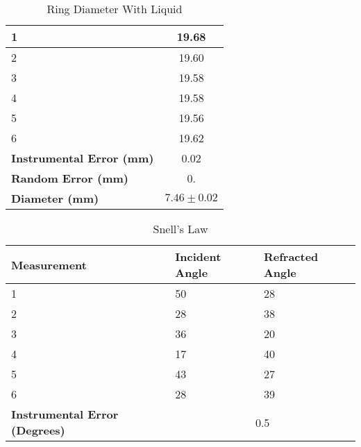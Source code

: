 \begin{center}
\begin{table}[!ht]
\begin{tabular}{|l|c|}
            1 & 19.68 \\ \hline
            2 & 19.60 \\ \hline
            3 & 19.58 \\ \hline
            4 & 19.58 \\ \hline
            5 & 19.56 \\ \hline
            6 & 19.62 \\ \hline \hline
            \textbf{Instrumental Error (mm)} & 0.02 \\ \hline
            \textbf{Random Error (mm)} & 0. \\ \hline
            \textbf{Diameter (mm)}   & $7.46\pm0.02$ \\ \hline
        \end{tabular}
        \caption{Ring Diameter With Liquid}
        \end{table}
    \begin{table}[!ht]
    \centering
    \begin{tabular}{|l|l|l|}
    \hline
        \textbf{Measurement} & \textbf{Incident Angle} & \textbf{Refracted Angle} \\ \hline
        1 & 50 & 28 \\ \hline
        2 & 28 & 38 \\ \hline
        3 & 36 & 20 \\ \hline
        4 & 17 & 40 \\ \hline
        5 & 43 & 27 \\ \hline
        6 & 28 & 39 \\ \hline \hline
        \textbf{Instrumental Error (Degrees)} & \multicolumn{2}{|c|}{0.5} \\ \hline
    \end{tabular}
    \caption{Snell's Law}
    \end{table}
\end{center}